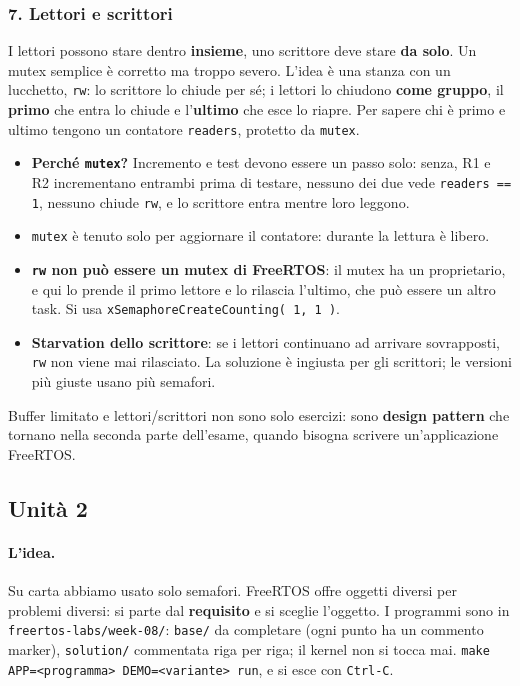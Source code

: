 \subsubsection*{7. Lettori e scrittori}
I lettori possono stare dentro \textbf{insieme}, uno scrittore deve stare \textbf{da solo}. Un mutex semplice è corretto ma troppo severo. L'idea è una stanza con un lucchetto, \texttt{rw}: lo scrittore lo chiude per sé; i lettori lo chiudono \textbf{come gruppo}, il \textbf{primo} che entra lo chiude e l'\textbf{ultimo} che esce lo riapre. Per sapere chi è primo e ultimo tengono un contatore \texttt{readers}, protetto da \texttt{mutex}.
\begin{itemize}
    \item \textbf{Perché \texttt{mutex}?} Incremento e test devono essere un passo solo: senza, R1 e R2 incrementano entrambi prima di testare, nessuno dei due vede \texttt{readers == 1}, nessuno chiude \texttt{rw}, e lo scrittore entra mentre loro leggono.
    \item \texttt{mutex} è tenuto solo per aggiornare il contatore: durante la lettura è libero.
    \item \textbf{\texttt{rw} non può essere un mutex di FreeRTOS}: il mutex ha un proprietario, e qui lo prende il primo lettore e lo rilascia l'ultimo, che può essere un altro task. Si usa \texttt{xSemaphoreCreateCounting( 1, 1 )}.
    \item \textbf{Starvation dello scrittore}: se i lettori continuano ad arrivare sovrapposti, \texttt{rw} non viene mai rilasciato. La soluzione è ingiusta per gli scrittori; le versioni più giuste usano più semafori.
\end{itemize}
Buffer limitato e lettori/scrittori non sono solo esercizi: sono \textbf{design pattern} che tornano nella seconda parte dell'esame, quando bisogna scrivere un'applicazione FreeRTOS.

\subsection{Unità 2}
\paragraph*{L'idea.} Su carta abbiamo usato solo semafori. FreeRTOS offre oggetti diversi per problemi diversi: si parte dal \textbf{requisito} e si sceglie l'oggetto. I programmi sono in \texttt{freertos-labs/week-08/}: \texttt{base/} da completare (ogni punto ha un commento marker), \texttt{solution/} commentata riga per riga; il kernel non si tocca mai. \texttt{make APP=<programma> DEMO=<variante> run}, e si esce con \texttt{Ctrl-C}.

